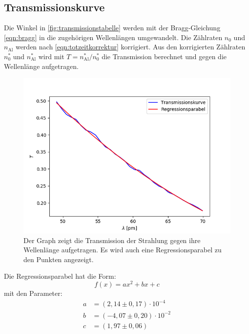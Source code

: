 \documentclass[titlepage = firstcover]{scrartcl}
\begin{document}
      \subsection{Transmissionskurve}
        Die Winkel in \ref{fig:transmissionstabelle} werden mit der Bragg-Gleichung \ref{eqn:bragg} in die zugehörigen Wellenlängen umgewandelt. Die Zählraten $n_0$ und $n_\text{Al}$ werden nach \ref{eqn:totzeitkorrektur} korrigiert. Aus den korrigierten Zählraten $n_0^*$ und $n_\text{Al}^*$ wird mit $T = n_\text{Al}^* / n_0^*$ die Transmission berechnet und gegen die Wellenlänge aufgetragen.
        \begin{figure}[h]
          \centering
          \includegraphics[width = 0.8\linewidth]{Transmissionskurve.png}
          \caption{Der Graph zeigt die Transmission der Strahlung gegen ihre Wellenlänge aufgetragen. Es wird auch eine Regressionsparabel zu den Punkten angezeigt.}
          \label{fig:transmissionskurve}
        \end{figure}
        \FloatBarrier

        Die Regressionsparabel hat die Form:
        \begin{equation*}
          f(x) = ax^2 + bx + c
        \end{equation*}
        mit den Parameter:
        \begin{align*}
          a &= (2,14 \pm 0,17) \cdot 10^{-4} \\
          b &= (-4,07 \pm 0,20) \cdot 10^{-2} \\
          c &= (1,97 \pm 0,06)
        \end{align*}
        
\end{document}
